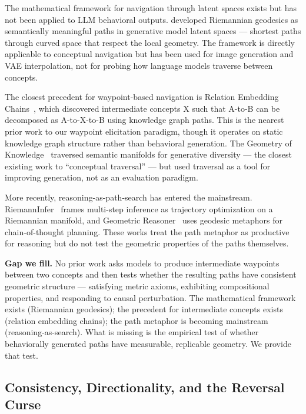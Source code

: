 The mathematical framework for navigation through latent spaces exists but has not been applied to LLM behavioral outputs. \citet{arvanitidis2018latent} developed Riemannian geodesics as semantically meaningful paths in generative model latent spaces --- shortest paths through curved space that respect the local geometry. The framework is directly applicable to conceptual navigation but has been used for image generation and VAE interpolation, not for probing how language models traverse between concepts.

The closest precedent for waypoint-based navigation is Relation Embedding Chains~\citep{relationchains2023}, which discovered intermediate concepts X such that A-to-B can be decomposed as A-to-X-to-B using knowledge graph paths. This is the nearest prior work to our waypoint elicitation paradigm, though it operates on static knowledge graph structure rather than behavioral generation. The Geometry of Knowledge~\citep{geometryknowledge2025} traversed semantic manifolds for generative diversity --- the closest existing work to ``conceptual traversal'' --- but used traversal as a tool for improving generation, not as an evaluation paradigm.

More recently, reasoning-as-path-search has entered the mainstream. RiemannInfer~\citep{riemanninfer2026} frames multi-step inference as trajectory optimization on a Riemannian manifold, and Geometric Reasoner~\citep{geometricreasoner2026} uses geodesic metaphors for chain-of-thought planning. These works treat the path metaphor as productive for reasoning but do not test the geometric properties of the paths themselves.

\textbf{Gap we fill.} No prior work asks models to produce intermediate waypoints between two concepts and then tests whether the resulting paths have consistent geometric structure --- satisfying metric axioms, exhibiting compositional properties, and responding to causal perturbation. The mathematical framework exists (Riemannian geodesics); the precedent for intermediate concepts exists (relation embedding chains); the path metaphor is becoming mainstream (reasoning-as-search). What is missing is the empirical test of whether behaviorally generated paths have measurable, replicable geometry. We provide that test.

\subsection{Consistency, Directionality, and the Reversal Curse}\label{consistency-directionality-and-the-reversal-curse}

